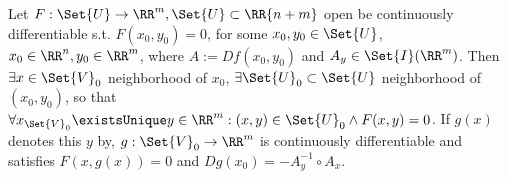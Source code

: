 \begin{thm}
  \label{thm:impFun}
  Let $F:\Set{U}\to\RR^m, \Set{U}\subset \RR{n+m}$ open be continuously differentiable s.t. $F(x_0,y_0)=0$, for some $x_0, y_0\in\Set{U}$, $x_0\in\RR^n, y_0\in\RR^m$, where $A:=D f(x_0,y_0)$ and $A_y\in\Set{I}(\RR^m)$. Then $\exists x\in \Set{V}_0$ neighborhood of $x_0$, $\exists \Set{U}_0\subset \Set{U}$ neighborhood of $(x_0,y_0)$, so that $\forall x_{\Set{V}_0}\existsUnique y\in \RR^m:(x,y)\in\Set{U}_0\land F(x,y)=0$. If $g(x)$ denotes this $y$ by, $g:\Set{V}_0\to\RR^m$ is continuously differentiable and satisfies $F(x,g(x))=0$ and $Dg(x_0)=-A_y^{-1}\circ A_x$.  
\end{thm}